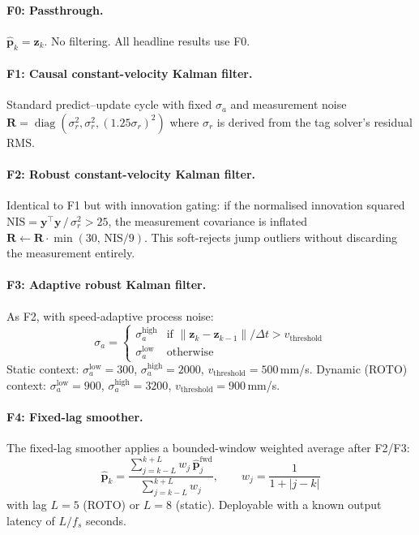 \documentclass[11pt,a4paper]{article}
\begin{document}
\paragraph{F0: Passthrough.}
$\hat{\mathbf{p}}_k = \mathbf{z}_k$. No filtering. All headline results use F0.

\paragraph{F1: Causal constant-velocity Kalman filter.}
Standard predict--update cycle with fixed $\sigma_a$ and measurement noise $\mathbf{R} = \operatorname{diag}(\sigma_r^2, \sigma_r^2, (1.25\sigma_r)^2)$ where $\sigma_r$ is derived from the tag solver's residual RMS.

\paragraph{F2: Robust constant-velocity Kalman filter.}
Identical to F1 but with innovation gating: if the normalised innovation squared
$\mathrm{NIS} = \mathbf{y}^\top \mathbf{y}\, /\, \sigma_r^2 > 25$,
the measurement covariance is inflated $\mathbf{R} \leftarrow \mathbf{R} \cdot \min(30,\, \mathrm{NIS}/9)$.
This soft-rejects jump outliers without discarding the measurement entirely.

\paragraph{F3: Adaptive robust Kalman filter.}
As F2, with speed-adaptive process noise:
\begin{equation}
  \sigma_a = \begin{cases}
    \sigma_a^{\mathrm{high}} & \text{if } \lVert\mathbf{z}_k - \mathbf{z}_{k-1}\rVert / \Delta t > v_{\mathrm{threshold}} \\
    \sigma_a^{\mathrm{low}}  & \text{otherwise}
  \end{cases}
\end{equation}
Static context: $\sigma_a^{\mathrm{low}} = 300$, $\sigma_a^{\mathrm{high}} = 2000$, $v_{\mathrm{threshold}} = 500$\,mm/s.
Dynamic (ROTO) context: $\sigma_a^{\mathrm{low}} = 900$, $\sigma_a^{\mathrm{high}} = 3200$, $v_{\mathrm{threshold}} = 900$\,mm/s.

\paragraph{F4: Fixed-lag smoother.}
The fixed-lag smoother applies a bounded-window weighted average after F2/F3:
\begin{equation}
  \hat{\mathbf{p}}_k = \frac{\sum_{j=k-L}^{k+L} w_j \,\hat{\mathbf{p}}_j^{\mathrm{fwd}}}{\sum_{j=k-L}^{k+L} w_j}, \qquad
  w_j = \frac{1}{1 + |j - k|}
\end{equation}
with lag $L = 5$ (ROTO) or $L = 8$ (static). Deployable with a known output latency of $L / f_s$ seconds.
\end{document}
